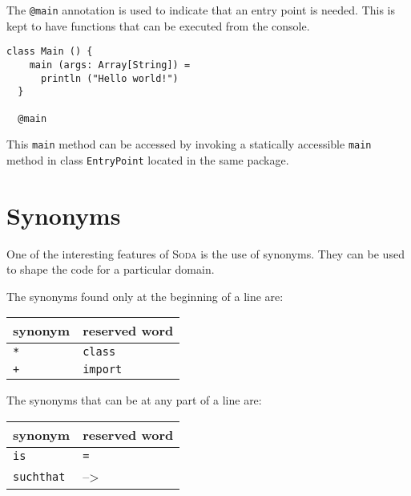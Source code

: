 \documentclass[12pt,a4paper]{book}
\makeatletter
\newcommand{\srccode}[1]{\texttt{{#1}}}
\newcommand{\reservedWord}[1]{{\color{blue}\srccode{#1}}\xspace}
\newcommand{\annotation}[1]{{\color{brown}\srccode{#1}}\xspace}
\newcommand{\sdef}{\srccode{=}\xspace}
\newcommand{\slambda}{{\tiny--\textgreater}\xspace}
\newcommand{\sclass}{\reservedWord{class}}
\newcommand{\simport}{\reservedWord{import}}
\newcommand{\smain}{\annotation{@main}}
\newcommand{\sasterisk}{\srccode{*}}
\newcommand{\splus}{\srccode{+}}
\newcommand{\sis}{\reservedWord{is}}
\newcommand{\ssuchthat}{\reservedWord{suchthat}}
\newcommand{\Soda}{\textsc{Soda}\xspace}
\makeatother
\begin{document}
    The \smain annotation is used to indicate that an entry point is needed.
    This is kept to have functions that can be executed from the console.

    \begin{lstlisting}[label={lst:exampleMain}]
  class Main () {
    main (args: Array[String]) =
      println ("Hello world!")
  }

  @main
    \end{lstlisting}

    This \srccode{main} method can be accessed by invoking a statically accessible \srccode{main} method in class \srccode{EntryPoint} located in the same package.


    \section{Synonyms}

    One of the interesting features of \Soda is the use of synonyms.
    They can be used to shape the code for a particular domain.

    The synonyms found only at the beginning of a line are:

    \begin{center}
        \begin{tabular}{|ll|}
            \hline
            \textbf{synonym} & \textbf{reserved word} \\
            \hline
            \sasterisk       & \sclass                \\
            \hline
            \splus           & \simport               \\
            \hline
        \end{tabular}
    \end{center}

    The synonyms that can be at any part of a line are:

    \begin{center}
        \begin{tabular}{|ll|}
            \hline
            \textbf{synonym} & \textbf{reserved word} \\
            \hline
            \sis             & \sdef                  \\
            \hline
            \ssuchthat       & \slambda               \\
            \hline
        \end{tabular}
    \end{center}
\end{document}
